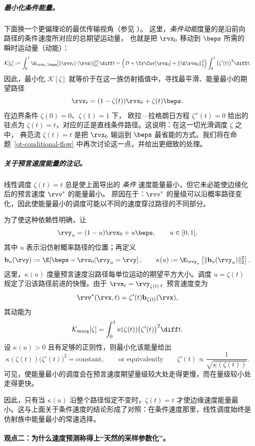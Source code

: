 \subparagraph{最小化条件能量。} 下面换一个更偏理论的最优传输视角（参见 ）。
这里，\emph{条件动能}度量的是沿前向路径的条件速度所对应的总期望运动量，
也就是把 $\rvx_0$ 移动到 $\beps$ 所需的瞬时运动量（动能）：
\[
\mathcal K[\zeta]
:=\int_0^1 \E_{\rvx_0,\beps}\!\big[\|\rvv_t(\cdot |\rvz)\|_2^2\big]\diff t
=\Big(D+\Tr\Cov[\rvx_0]+\|\E\rvx_0\|_2^2\Big)
\int_0^1 \big(\zeta'(t)\big)^2\diff t.
\]
因此，最小化 $\mathcal K[\zeta]$ 就等价于在这一族仿射插值中，寻找最平滑、能量最小的期望路径
\[
\rvx_t=(1-\zeta(t))\rvx_0+\zeta(t)\beps.
\]
在边界条件 $\zeta(0)=0$、$\zeta(1)=1$ 下，
欧拉—拉格朗日方程 $\zeta''(t)=0$ 给出的驻点为 $\zeta(t)=t$，对应的正是直线条件路径。这说明：在这一切光滑调度 $\zeta$ 之中，
典范流 $\zeta(t)=t$ 是把 $\rvx_0$ 输运到 $\beps$ 最省能的方式。我们将在命题~\ref{ot-conditional-flow} 中再次讨论这一点，并给出更细致的处理。


\subparagraph{关于预言速度能量的注记。}
线性调度 $\zeta(t)=t$ 总是使上面导出的 \emph{条件}
速度能量最小，但它未必能使边缘化后的预言速度 $\rvv^*$ 的能量最小。
原因在于：$\rvv^*$ 的量级可以沿概率路径变化，因此使能量最小的调度可能以不同的速度穿过路径的不同部分。

为了使这种依赖性明确，让
\[
\rvy_u=(1-u)\rvx_0+u\beps,
\qquad u\in[0,1],
\]
其中 $u$ 表示沿仿射概率路径的位置；再定义
\[
\mathbf{b}_u(\rvy)
:=
\E\!\left[\beps-\rvx_0|\rvy_u=\rvy\right],
\qquad
\kappa(u)
:=
\E_{\rvy_u}
\left[
\|\mathbf{b}_u(\rvy_u)\|_2^2
\right].
\]
这里，$\kappa(u)$ 度量预言速度沿路径每单位运动的期望平方大小。调度 $u=\zeta(t)$ 规定了沿该路径前进的快慢。由于
$\rvx_t=\rvy_{\zeta(t)}$，预言速度变为
\[
\rvv^*(\rvx,t)
=
\zeta'(t)\mathbf{b}_{\zeta(t)}(\rvx),
\]
其动能为
\[
\mathcal{K}_{\mathrm{marg}}[\zeta]
=
\int_0^1
\kappa(\zeta(t))
\bigl(\zeta'(t)\bigr)^2
\diff t.
\]
设 $\kappa(u)>0$ 且有足够的正则性，则最小化该能量给出
\[
\kappa(\zeta(t))
\bigl(\zeta'(t)\bigr)^2
=
\text{constant},
\qquad\text{or equivalently}\qquad
\zeta'(t)
\propto
\frac{1}{\sqrt{\kappa(\zeta(t))}}.
\]
可见，使能量最小的调度会在预言速度期望量级较大处走得更慢，而在量级较小处走得更快。

因此，只有当 $\kappa(u)$ 沿整个路径恒定不变时，$\zeta(t)=t$ 才使边缘速度能量最小。这与上面关于条件速度的结论形成了对照：在条件速度那里，线性调度始终是仿射族中能量最小的常速选择。


\paragraph{观点二：为什么速度预测称得上“天然的采样参数化”。}

